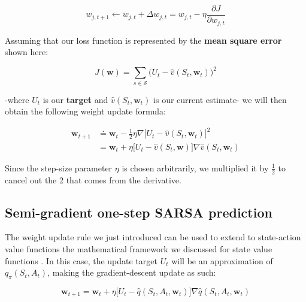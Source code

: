 \begin{equation}
    w_{j,t+1} \leftarrow w_{j,t} + \Delta w_{j,t} = w_{j,t} - \eta \frac{\partial J}{\partial w_{j,t}}
    \label{eq:ch7-singlesgdfunctionapproxupdate}
\end{equation}

Assuming that our loss function is represented by the \textbf{mean square error} shown here:

\begin{equation}
    J(\boldsymbol{w}) = \sum_{s \in \mathcal{S}} \big(U_t - \hat{v}(S_t, \boldsymbol{w}_t) \big)^2
    \label{eq:ch7-meansquareerrorfunction}
\end{equation}

-where $U_t$ is our \textbf{target} and $\hat{v}(S_t, \boldsymbol{w}_t)$ is our current estimate- we will then obtain the following weight update formula:

\begin{equation}
    \begin{split}
        \boldsymbol{w}_{t+1} &\doteq \boldsymbol{w}_t - \frac{1}{2} \eta \nabla \big[ U_t - \hat{v}(S_t, \boldsymbol{w}_t) \big]^2 \\
        &= \boldsymbol{w}_t + \eta \big[ U_t - \hat{v}(S_t, \boldsymbol{w}) \big] \nabla \hat{v} (S_t, \boldsymbol{w}_t)
    \end{split}
    \label{eq:ch7-genericstatefunctionapproxssdweightupdate}
\end{equation}

Since the step-size parameter $\eta$ is chosen arbitrarily, we multiplied it by $\frac{1}{2}$ to cancel out the 2 that comes from the derivative.

\subsection{Semi-gradient one-step SARSA prediction}
The weight update rule we just introduced can be used to extend to state-action value functions the mathematical framework we discussed for state value functions . In this case, the update target $U_t$ will be an approximation of $q_\pi (S_t,A_t )$, making the gradient-descent update as such:

\begin{equation}
    \boldsymbol{w}_{t+1} = \boldsymbol{w}_t + \eta \big[ U_t - \hat{q}(S_t,A_t,\boldsymbol{w}_t) \big] \nabla \hat{q}(S_t,A_t,\boldsymbol{w}_t)
    \label{eq:ch7-genericqvaluefunctionapproxssdweightupdate}
\end{equation}

